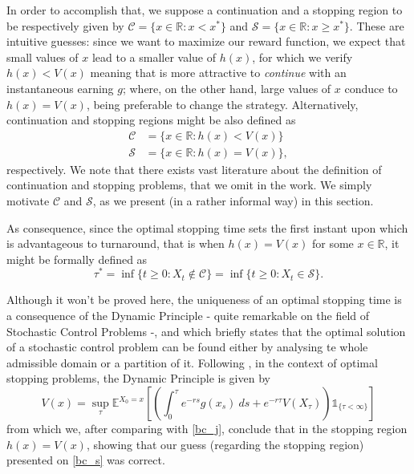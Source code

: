 In order to accomplish that, we suppose a continuation and a stopping region to be respectively given by $\mathcal{C}=\{ x\in \mathds{R}: x<x^* \}$ and $\mathcal{S}=\{ x\in \mathds{R}: x\geq x^* \}$. These are intuitive guesses: since we want to maximize our reward function, we expect that small values of $x$ lead to a smaller value of $h(x)$, for which we verify $h(x)<V(x)$ meaning that is more attractive to \textit{continue} with an instantaneous earning $g$; where, on the other hand, large values of $x$ conduce to $h(x)=V(x)$, being preferable to change the strategy. Alternatively, continuation and stopping regions might be also defined as
\begin{align}
 \mathcal{C}&=\{ x\in \mathds{R}: h(x)<V(x) \} \label{bc_c}\\
 \mathcal{S}&=\{ x\in \mathds{R}: h(x)=V(x) \} \label{bc_s},
\end{align}
respectively. We note that there exists vast literature about the definition of continuation and stopping problems, that we omit in the work. We simply motivate $\mathcal{C}$ and $\mathcal{S}$, as we present (in a rather informal way) in this section.

As consequence, since the optimal stopping time sets the first instant upon which is advantageous to turnaround, that is when $h(x)=V(x)$ for some $x \in \mathds{R}$, it might be formally defined as
\begin{equation}
\tau^*=\inf \{ t \geq 0: X_t \notin \mathcal{C} \}=\inf \{ t \geq 0: X_t \in \mathcal{S} \}.
\label{stoptime}
\end{equation}


Although it won't be proved here, the uniqueness of an optimal stopping time is a consequence of the Dynamic Principle - quite remarkable on the field of Stochastic Control Problems -, and which briefly states that the optimal solution of a stochastic control problem can be found either by analysing te whole admissible domain or a partition of it. Following \cite{ross}, in the context of optimal stopping problems, the Dynamic Principle is given by
\begin{equation}
V(x)=\sup_\tau \mathds{E}^{X_0=x} \left[ \left( \int^\tau_0 e^{-rs}g(x_s) \ ds + e^{-r \tau}V(X_\tau) \right) \mathds{1}_{ \{\tau< \infty \}}  \right]
\label{bc_2}
\end{equation}
from which we, after comparing with \eqref{bc_j}, conclude that in the stopping region $h(x)=V(x)$, showing that our guess (regarding the stopping region) presented on \eqref{bc_s} was correct. 

